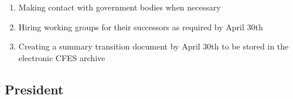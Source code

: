 \begin{enumerate}
\begin{enumerate}
    \begin{enumerate}
     \item
      Ensuring all official communications are bilingual and gender neutral
     \item
      Ensuring updates on tasks done by each member of the CFES Team are compiled and distributed to members at least every two months
     \item
      Ensuring outcomes reports are completed for any meetings or other external events attended by a member of the CFES Team
    \end{enumerate}
   \item
    Making contact with government bodies when necessary
   \item
    Hiring working groups for their successors as required by April 30th
   \item
    Creating a summary transition document by April 30th to be stored in the electronic CFES archive
  \end{enumerate}
\end{enumerate}

\subsection{President}
\label{president}

